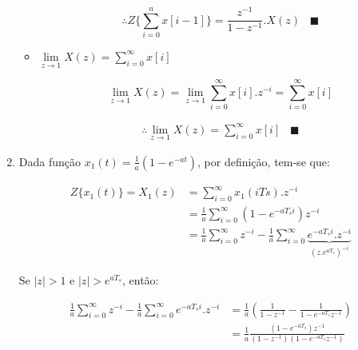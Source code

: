 \documentclass[twoside, fleqn]{article}
\begin{document}
\begin{enumerate}
\begin{itemize}
            	\begin{equation}
            	\therefore Z\{\sum_{i=0}^{n}x[i-1] \} = \frac{z^{-1}}{1-z^{-1}}.X(z) \hspace{10pt} \blacksquare
            	\end{equation}
            
            	\item $\lim\limits_{z \rightarrow 1} X(z) = \sum_{i=0}^{\infty}x[i]$
            
            	\begin{equation}
            	\lim\limits_{z \rightarrow 1} X(z) = \lim\limits_{z \rightarrow 1} \sum_{i=0}^{\infty} x[i].z^{-i} = \sum_{i=0}^{\infty} x[i]
            	\end{equation}
            	
            	\begin{equation}
            	\begin{split}
            	\therefore \lim\limits_{z \rightarrow 1} X(z) = \sum_{i=0}^{\infty}x[i] \hspace{10pt} \blacksquare
            	\end{split}
            	\end{equation}
            	
            \end{itemize}
        
        \item\label{item:ex2b} %
        
        Dada função $x_1(t) = \frac{1}{a} \left( 1 - e^{-at} \right)$, por definição, tem-se que:
        
        	\begin{equation}
            	\begin{split}
                	Z\{x_1(t)\} = X_1(z) & = \sum_{i=0}^{\infty} x_1(i Ts).z^{-i} \\
                	& = \frac{1}{a} \sum_{i=0}^{\infty} \left( 1 - e^{-a T_s i} \right)z^{-i} \\
                	& = \frac{1}{a} \sum_{i=0}^{\infty} z^{-i} - \frac{1}{a} \sum_{i=0}^{\infty} \underbrace{e^{-a T_s i}.z^{-i}}_{(z.e^{aT_s})^{-i}}
            	\end{split}
        	\end{equation}
        
        Se $|z| > 1$ e $|z| > e^{aT_s}$, então:
        	
        	\begin{equation}
            	\begin{split}
                	\frac{1}{a} \sum_{i=0}^{\infty} z^{-i} - \frac{1}{a} \sum_{i=0}^{\infty} e^{-a T_s i}.z^{-i} & = \frac{1}{a} (\frac{1}{1-z^ {-1}} - \frac{1}{1-e^{-aT_s} z^ {-1}}) \\
                	& = \frac{1}{a} \frac{(1 - e^{-aT_s})z^{-1}}{(1-z^{-1})(1-e^{-aT_s} z^ {-1})}
            	\end{split}
        	\end{equation}
        	

\end{enumerate}
\end{document}
